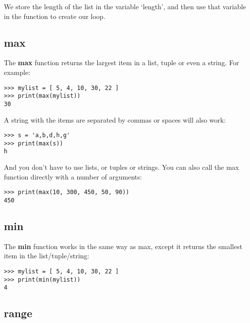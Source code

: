 \noindent
We store the length of the list in the variable `length', and then use that variable in the  function to create our loop.

\subsection*{max}

The \textbf{max} function returns the largest item in a list, tuple or even a string. For example:

\begin{listing}
\begin{verbatim}
>>> mylist = [ 5, 4, 10, 30, 22 ]
>>> print(max(mylist))
30
\end{verbatim}
\end{listing}

\noindent
A string with the items are separated by commas or spaces will also work:

\begin{listing}
\begin{verbatim}
>>> s = 'a,b,d,h,g'
>>> print(max(s))
h
\end{verbatim}
\end{listing}

\noindent
And you don't have to use lists, or tuples or strings. You can also call the max function directly with a number of arguments:

\begin{listing}
\begin{verbatim}
>>> print(max(10, 300, 450, 50, 90))
450
\end{verbatim}
\end{listing}

\subsection*{min}

The \textbf{min} function works in the same way as max, except it returns the smallest item in the list/tuple/string:

\begin{listing}
\begin{verbatim}
>>> mylist = [ 5, 4, 10, 30, 22 ]
>>> print(min(mylist))
4
\end{verbatim}
\end{listing}

\subsection*{range}

